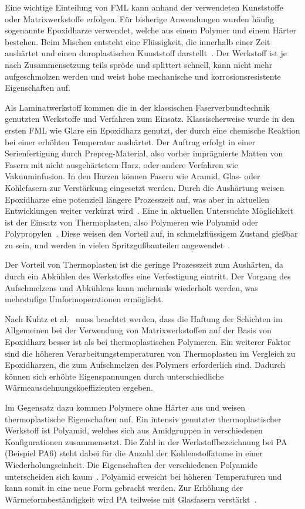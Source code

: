 
Eine wichtige Einteilung von FML kann anhand der verwendeten Kunststoffe oder Matrixwerkstoffe erfolgen.
Für bisherige Anwendungen wurden häufig sogenannte Epoxidharze verwendet, welche aus einem Polymer und einem Härter bestehen.
Beim Mischen entsteht eine Flüssigkeit, die innerhalb einer Zeit aushärtet und einen duroplastischen Kunststoff darstellt~\cite{Dornbusch2015}.
Der Werkstoff ist je nach Zusammensetzung teils spröde und splittert schnell, kann nicht mehr aufgeschmolzen werden und weist hohe mechanische und korrosionsresistente Eigenschaften auf.

Als Laminatwerkstoff kommen die in der klassischen Faserverbundtechnik genutzten Werkstoffe und Verfahren zum Einsatz.
Klassischerweise wurde in den ersten FML wie Glare ein Epoxidharz genutzt, der durch eine chemische Reaktion bei einer erhöhten Temperatur aushärtet.
Der Auftrag erfolgt in einer Serienfertigung durch Prepreg-Material, also vorher imprägnierte Matten von Fasern mit nicht ausgehärtetem Harz, oder andere Verfahren wie Vakuuminfusion.
In den Harzen können Fasern wie Aramid, Glas- oder Kohlefasern zur Verstärkung eingesetzt werden.
Durch die Aushärtung weisen Epoxidharze eine potenziell längere Prozesszeit auf, was aber in aktuellen Entwicklungen weiter verkürzt wird~\cite{Lakho2017}.
Eine in aktuellen Untersuchte Möglichkeit ist der Einsatz von Thermoplasten, also Polymeren wie Polyamid oder Polypropylen~\cite{Flock2012}.
Diese weisen den Vorteil auf, in schmelzflüssigem Zustand gießbar zu sein, und werden in vielen Spritzgußbauteilen angewendet~\cite{Ehrenstein2003}.

Der Vorteil von Thermoplasten ist die geringe Prozesszeit zum Aushärten, da durch ein Abkühlen des Werkstoffes eine Verfestigung eintritt.
Der Vorgang des Aufschmelzens und Abkühlens kann mehrmals wiederholt werden, was mehrstufige Umformoperationen ermöglicht.

Nach Kuhtz et al.~\cite{Kuhtz2019} muss beachtet werden, dass die Haftung der Schichten im Allgemeinen bei der Verwendung von Matrixwerkstoffen auf der Basis von Epoxidharz besser ist als bei thermoplastischen Polymeren.
Ein weiterer Faktor sind die höheren Verarbeitungstemperaturen von Thermoplasten im Vergleich zu Epoxidharzen, die zum Aufschmelzen des Polymers erforderlich sind.
Dadurch können sich erhöhte Eigenspannungen durch unterschiedliche Wärmeausdehnungskoeffizienten ergeben.

Im Gegensatz dazu kommen Polymere ohne Härter aus und weisen thermoplastische Eigenschaften auf.
Ein intensiv genutzter thermoplastischer Werkstoff ist Polyamid, welches sich aus Amidgruppen in verschiedenen Konfigurationen zusammensetzt.
Die Zahl in der Werkstoffbezeichnung bei PA (Beispiel PA6) steht dabei für die Anzahl der Kohlenstoffatome in einer Wiederholungseinheit.
Die Eigenschaften der verschiedenen Polyamide unterscheiden sich kaum~\cite{Flock2012}.
Polyamid erweicht bei höheren Temperaturen und kann somit in eine neue Form gebracht werden.
Zur Erhöhung der Wärmeformbeständigkeit wird PA teilweise mit Glasfasern verstärkt~\cite{Baur2007}.

